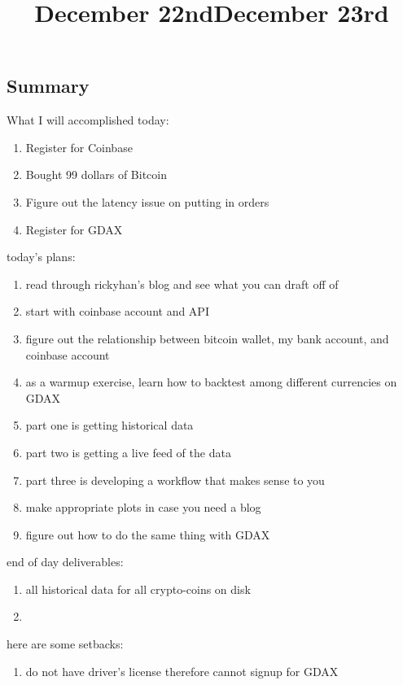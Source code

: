 \title{December 22nd}

\subsection{Summary}

What I will accomplished today:

\begin{enumerate}
	\item Register for Coinbase
	\item Bought 99 dollars of Bitcoin
	\item Figure out the latency issue on putting in orders
	\item Register for GDAX
\end{enumerate}


\title{December 23rd}

today's plans:

\begin{enumerate}
	\item read through rickyhan's blog and see what you can draft off of
	\item start with coinbase account and API
	\item figure out the relationship between bitcoin wallet, my bank account, and coinbase account
	\item as a warmup exercise, learn how to backtest among different currencies on GDAX
	\item part one is getting historical data
	\item part two is getting a live feed of the data
	\item part three is developing a workflow that makes sense to you
	\item make appropriate plots in case you need a blog
	\item figure out how to do the same thing with GDAX
\end{enumerate}


end of day deliverables: 

\begin{enumerate}
	\item all historical data for all crypto-coins on disk
	\item 
\end{enumerate}

here are some setbacks:

\begin{enumerate}
	\item do not have driver's license therefore cannot signup for GDAX
\end{enumerate}


